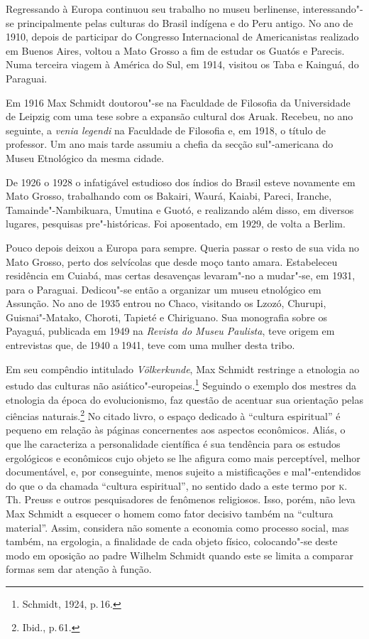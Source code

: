 Regressando à Europa continuou seu trabalho no museu berlinense,
interessando"-se principalmente pelas culturas do Brasil indígena e do
Peru antigo. No ano de 1910, depois de participar do Congresso
Internacional de Americanistas realizado em Buenos Aires, voltou a Mato
Grosso a fim de estudar os Guatós e Parecis. Numa terceira viagem à
América do Sul, em 1914, visitou os Taba e Kainguá, do Paraguai.

Em 1916 Max Schmidt doutorou"-se na Faculdade de Filosofia da
Universidade de Leipzig com uma tese sobre a expansão cultural dos
Aruak. Recebeu, no ano seguinte, a \textit{venia legendi} na Faculdade de
Filosofia e, em 1918, o título de professor.
Um ano mais tarde assumiu a chefia da secção sul"-americana do Museu
Etnológico da mesma cidade.

De 1926 o 1928 o infatigável estudioso dos índios do Brasil esteve
novamente em Mato Grosso, trabalhando com os Bakairi, Waurá, Kaiabi,
Pareci, Iranche, Tamainde"-Nambikuara, Umutina e Guotó, e realizando além
disso, em diversos lugares, pesquisas pre"-históricas. Foi aposentado, em
1929, de volta a Berlim.

Pouco depois deixou a Europa para sempre. Queria passar o resto de sua
vida no Mato Grosso, perto dos selvícolas que desde moço tanto amara.
Estabeleceu residência em Cuiabá, mas certas desavenças levaram"-no a
mudar"-se, em 1931, para o Paraguai. Dedicou"-se então a organizar um
museu etnológico em Assunção. No ano de 1935 entrou no Chaco, visitando
os Lzozó, Churupi, Guisnai"-Matako, Choroti, Tapieté e Chiriguano. Sua
monografia sobre os Payaguá, publicada em 1949 na \textit{Revista do Museu
Paulista}, teve origem em entrevistas que, de 1940 a 1941, teve com uma
mulher desta tribo.


Em seu compêndio intitulado \textit{Völkerkunde}, Max
Schmidt restringe a etnologia ao estudo das culturas não
asiático"-europeias.\footnote{Schmidt, 1924, p.\,16.} Seguindo o exemplo dos mestres da etnologia
da época do evolucionismo, faz questão de acentuar sua orientação pelas
ciências naturais.\footnote{Ibid., p.\,61.} No citado livro, o espaço dedicado à
``cultura espiritual'' é pequeno em relação às páginas concernentes aos
aspectos econômicos. Aliás, o que lhe caracteriza a personalidade
científica é sua tendência para os estudos ergológicos e econômicos cujo
objeto se lhe afigura como mais perceptível, melhor documentável, e, por
conseguinte, menos sujeito a mistificações e mal"-entendidos do que o da
chamada ``cultura espiritual'', no sentido dado a este termo por \textsc{k}.\,Th.
Preuss e outros pesquisadores de fenômenos religiosos. Isso, porém, não
leva Max Schmidt a esquecer o homem como fator decisivo também na
``cultura material''. Assim, considera não somente a economia como
processo social, mas também, na ergologia, a finalidade de cada objeto
físico, colocando"-se deste modo em oposição ao padre Wilhelm Schmidt
quando este se limita a comparar formas sem dar atenção à função.

